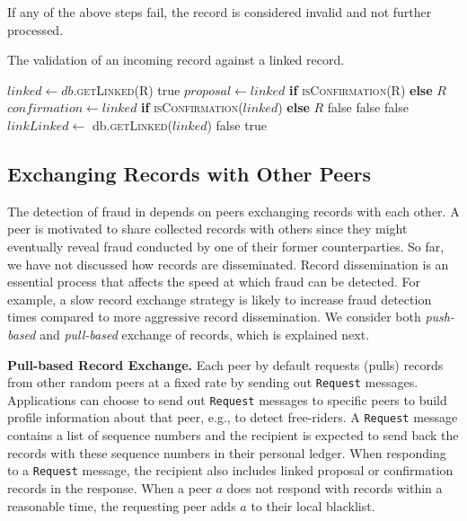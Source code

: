 If any of the above steps fail, the record is considered invalid and not further processed.

\begin{algorithm}[t]
	\caption{The validation of an incoming record against a linked record.}
	\label{alg:record_validation_step3}
	\begin{algorithmic}[1]
		  
		\State $ linked \leftarrow db $.\textsc{getLinked(R)}
		\State \Return true
		\EndIf
		\State
		\State $ proposal \leftarrow linked $ \textbf{if} \textsc{isConfirmation(R)} \textbf{else} $ R $
		\State $ confirmation \leftarrow linked $ \textbf{if} \textsc{isConfirmation($ linked $)} \textbf{else} $ R $
		\State
		\State \Return false
		\EndIf
		\State \Return false
		\EndIf
		\State \Return false
		\EndIf
		\State $ linkLinked \leftarrow $ db.\textsc{getLinked(}$ linked $\textsc{)}
		\State \Return false
		\EndIf
		\State \Return true
		\EndProcedure
	\end{algorithmic}
\end{algorithm}

\subsection{Exchanging Records with Other Peers}
\label{sec:exchanging_records}
The detection of fraud in \TrustChain{} depends on peers exchanging records with each other.
A peer is motivated to share collected records with others since they might eventually reveal fraud conducted by one of their former counterparties.
So far, we have not discussed how records are disseminated.
Record dissemination is an essential process that affects the speed at which fraud can be detected.
For example, a slow record exchange strategy is likely to increase fraud detection times compared to more aggressive record dissemination.
We consider both \emph{push-based} and \emph{pull-based} exchange of records, which is explained next.

\textbf{Pull-based Record Exchange.}
Each peer by default requests (pulls) records from other random peers at a fixed rate by sending out \texttt{Request} messages.
Applications can choose to send out \texttt{Request} messages to specific peers to build profile information about that peer, e.g., to detect free-riders.
A \texttt{Request} message contains a list of sequence numbers and the recipient is expected to send back the records with these sequence numbers in their personal ledger.
When responding to a \texttt{Request} message, the recipient also includes linked proposal or confirmation records in the response.
When a peer $ a $ does not respond with records within a reasonable time, the requesting peer adds $ a $ to their local blacklist.

